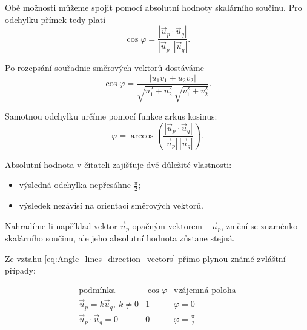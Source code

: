 Obě možnosti můžeme spojit pomocí absolutní hodnoty skalárního
součinu. Pro odchylku přímek tedy platí
\begin{equation}\label{eq:Angle_lines_direction_vectors}
        \cos\varphi
    =
    \frac{
        \left|\vec{u}_p\cdot\vec{u}_q\right|
    }
    {
        |\vec{u}_p|\,|\vec{u}_q|
    }.
\end{equation}

Po rozepsání souřadnic směrových vektorů dostáváme
\begin{equation}\label{eq:Angle_lines_direction_vectors_coordinates}
    \cos\varphi
    =
    \frac{
        |u_1v_1+u_2v_2|
    }
    {
        \sqrt{u_1^2+u_2^2}\,
        \sqrt{v_1^2+v_2^2}
    }.
\end{equation}

Samotnou odchylku určíme pomocí funkce arkus kosinus:
\begin{equation}\label{eq:Angle_lines_arccos}
    \varphi
    =
    \arccos
    \left(
        \frac{
            \left|\vec{u}_p\cdot\vec{u}_q\right|
        }
        {
            |\vec{u}_p|\,|\vec{u}_q|
        }
    \right).
\end{equation}

\begin{remark}\label{rem:Absolute_value_angle_lines}
    Absolutní hodnota v čitateli zajišťuje dvě důležité vlastnosti:

    \begin{itemize}
        \item výsledná odchylka nepřesáhne $\frac{\pi}{2}$;
        \item výsledek nezávisí na orientaci směrových vektorů.
    \end{itemize}

    Nahradíme-li například vektor $\vec{u}_p$ opačným vektorem
    $-\vec{u}_p$, změní se znaménko skalárního součinu, ale jeho
    absolutní hodnota zůstane stejná.
\end{remark}

Ze vztahu \eqref{eq:Angle_lines_direction_vectors} přímo plynou známé
zvláštní případy:

\[
\begin{array}{c|c|c}
    \text{podmínka}
    &
    \cos\varphi
    &
    \text{vzájemná poloha}
    \\
    \hline
    \vec{u}_p=k\vec{u}_q,\ k\neq0
    &
    1
    &
    \varphi=0
    \\[1mm]
    \vec{u}_p\cdot\vec{u}_q=0
    &
    0
    &
    \varphi=\frac{\pi}{2}
\end{array}
\]

